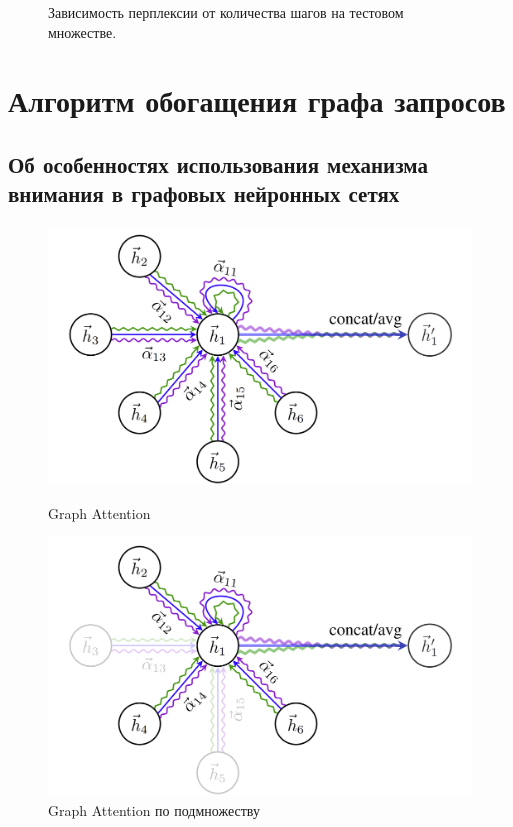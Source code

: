 \documentclass[diploma]{nanolab2015}
\begin{document}
\begin{figure}[ht]
    \centering
    
    \caption{Зависимость перплексии от количества шагов на тестовом множестве.}
    \label{pic3}
\end{figure}

\newpage

\section{Алгоритм обогащения графа запросов}
\subsection{Об особенностях использования механизма внимания в графовых нейронных сетях}
\begin{figure}[ht]
\centering
\begin{minipage}{.5\textwidth}
  \centering
  \includegraphics[width=1.0\linewidth]{./assets/GAT_layer_normal.png}
  \caption{Graph Attention}\label{pic4}
\end{minipage}%
\begin{minipage}{.5\textwidth}
  \centering
  \includegraphics[width=1.0\linewidth]{./assets/GAT_layer_opacity.png}
  \caption{Graph Attention по подмножеству}\label{pic5}
\end{minipage}
\end{figure}
\end{document}
